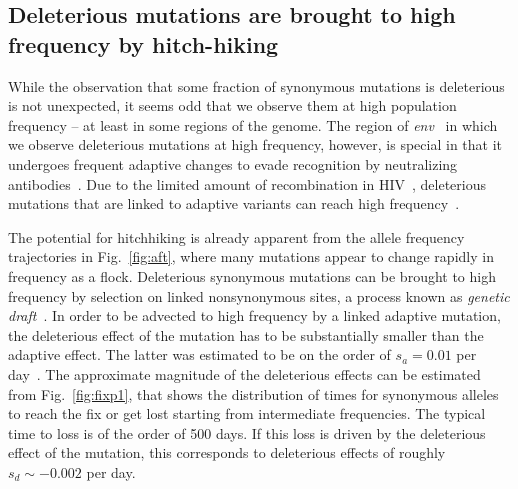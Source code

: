 \documentclass[rmp, twocolumn]{revtex4}
\newcommand{\FIG}[1]{Fig.~\ref{fig:#1}}
\newcommand{\env}{\textit{env}}
\begin{document}
\subsection{Deleterious mutations are brought to high frequency by hitch-hiking}

While the observation that some fraction of synonymous mutations is deleterious
is not unexpected, it seems odd that we observe them at high population
frequency -- at least in some regions of the genome. The region of \env~ in
which we observe deleterious mutations at high frequency, however, is special in
that it undergoes frequent adaptive changes to evade recognition by neutralizing
antibodies~\cite{williamson_adaptation_2003,richman_rapid_2003}. Due to the limited amount of
recombination in HIV~\cite{neher_recombination_2010,batorsky_estimate_2011},
deleterious mutations that are linked to adaptive variants can reach high
frequency~\citep[genetic hitchhiking,][]{smith_hitch-hiking_1974}.

The potential for hitchhiking is already apparent from the allele frequency
trajectories in \FIG{aft}, where many mutations appear to change rapidly in
frequency as a flock. Deleterious synonymous mutations can be brought to high
frequency by selection on linked nonsynonymous sites, a process
known as {\it genetic draft}~\citep{gillespie_genetic_2000, neher_genetic_2011}. In order
to be advected to high frequency by a linked adaptive mutation, the deleterious
effect of the mutation has to be substantially smaller than the adaptive effect.
The latter was estimated to be on the order of $s_a = 0.01$ per day~\citep{neher_recombination_2010}.
The approximate magnitude of the deleterious effects can be estimated from
\FIG{fixp1}, that shows the distribution of times for synonymous
alleles to reach the fix or get lost starting from intermediate frequencies. The
typical time to loss is of the order of 500 days. If this loss is driven by the
deleterious effect of the mutation, this corresponds to deleterious effects of
roughly $s_d \sim - 0.002$ per day.
\end{document}
